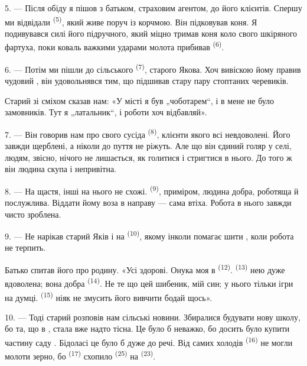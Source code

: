\VUsaut{3.0mm}

5. --- Після обіду я пішов з батьком, страховим агентом, до його клієнтів.
Спершу ми відвідали  \textsuperscript{(5)}, який живе поруч із
корчмою. Він підковував коня. Я подивувався силі його підручного, який міцно
тримав  коня коло свого шкіряного фартуха, поки коваль важкими
ударами молота прибивав  \textsuperscript{(6)}.

6. --- Потім ми пішли до сільського  \textsuperscript{(7)}, старого
Якова. Хоч вивіскою йому правив чудовий , він удовольнявся тим, що
підшивав стару пару стоптаних черевиків.

Старий зі сміхом сказав нам: «У місті я був „чоботарем“, і в мене не було
замовників. Тут я „латальник“, і роботи хоч відбавляй».

7. --- Він говорив нам про свого сусіда  \textsuperscript{(8)},
клієнти якого всі невдоволені. Його  завжди щерблені, а
 ніколи до пуття не ріжуть. Але що він єдиний голяр у селі,
людям, звісно, нічого не лишається, як голитися і стригтися в нього. До того ж
він людина скупа і непривітна.

8. --- На щастя, інші  на нього не схожі. 
\textsuperscript{(9)}, приміром, людина добра, роботяща й послужлива. Віддати
йому воза в направу --- сама втіха. Робота в нього завжди чисто зроблена.

9. --- Не нарікав старий Яків і на  \textsuperscript{(10)}, якому
інколи помагає шити , коли робота не терпить.

Батько спитав його про родину. «Усі здорові. Онука моя в 
\textsuperscript{(12)}.  \textsuperscript{(13)} нею дуже
вдоволена; вона добра  \textsuperscript{(14)}. Не те що цей
шибеник, мій син; у нього тільки ігри на думці. 
\textsuperscript{(15)} ніяк не змусить його вивчити бодай щось».

\VUsaut{3.0mm}
\VUsaut{3.0mm}

10. --- Тоді старий розповів нам сільські новини. Збиралися будувати нову школу,
бо та, що в , стала вже надто тісна. Це було б
неважко, бо досить було купити частину саду . Бідоласі це було
б дуже до речі. Від самих холодів  
\textsuperscript{(16)} не могли молоти зерно, бо 
\textsuperscript{(17)} схопило  \textsuperscript{(25)} на
 \textsuperscript{(23)}.

